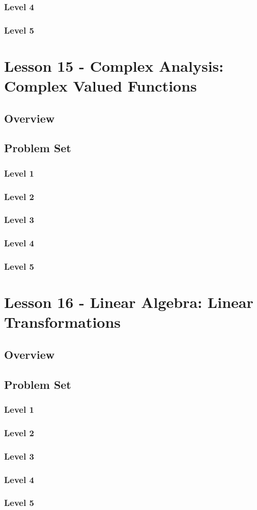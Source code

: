 \documentclass{article}
\begin{document}
\subsubsection{Level 4}
\subsubsection{Level 5}
\pagebreak

\section{Lesson 15 - Complex Analysis: Complex Valued Functions}
\subsection{Overview}
\subsection{Problem Set}
\subsubsection{Level 1}
\subsubsection{Level 2}
\subsubsection{Level 3}
\subsubsection{Level 4}
\subsubsection{Level 5}
\pagebreak

\section{Lesson 16 - Linear Algebra: Linear Transformations}
\subsection{Overview}
\subsection{Problem Set}
\subsubsection{Level 1}
\subsubsection{Level 2}
\subsubsection{Level 3}
\subsubsection{Level 4}
\subsubsection{Level 5}
\pagebreak
\end{document}
